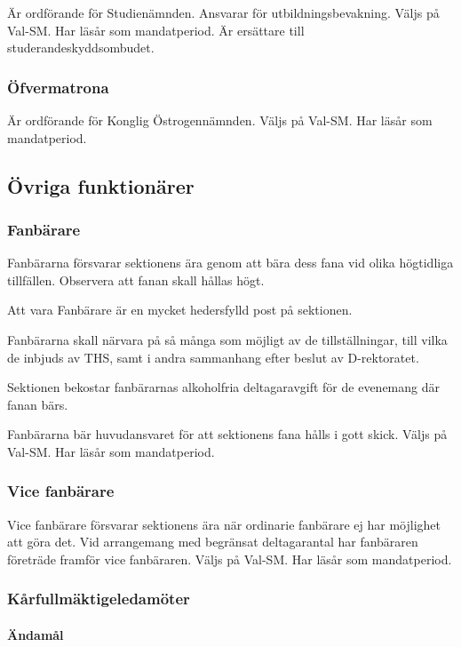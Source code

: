 \documentclass{dgovdoc}
\begin{document}
Är ordförande för Studienämnden. Ansvarar för utbildningsbevakning. Väljs på Val-SM. Har läsår som mandatperiod. Är ersättare till studerandeskyddsombudet.

\subsubsection{Öfvermatrona}

Är ordförande för Konglig Östrogennämnden. Väljs på Val-SM. Har läsår som
mandatperiod.

\subsection{Övriga funktionärer}

\subsubsection{Fanbärare}

Fanbärarna försvarar sektionens ära genom att bära dess fana vid olika högtidliga tillfällen. Observera att fanan skall hållas högt.

Att vara Fanbärare är en mycket hedersfylld post på sektionen.

Fanbärarna skall närvara på så många som möjligt av de tillställningar, till vilka de inbjuds av THS, samt i andra sammanhang efter beslut av D-rektoratet.

Sektionen bekostar fanbärarnas alkoholfria deltagaravgift för de evenemang där fanan bärs.

Fanbärarna bär huvudansvaret för att sektionens fana hålls i gott skick. Väljs på Val-SM. Har läsår som mandatperiod.

\subsubsection{Vice fanbärare}

Vice fanbärare försvarar sektionens ära när ordinarie fanbärare ej har möjlighet att göra det. Vid arrangemang med begränsat deltagarantal har fanbäraren företräde framför vice fanbäraren. Väljs på Val-SM. Har läsår som mandatperiod.

\subsubsection{Kårfullmäktigeledamöter}

\paragraph{Ändamål}
\end{document}
